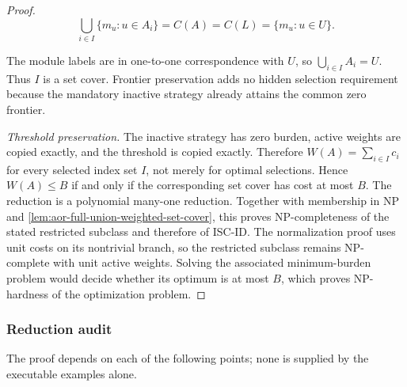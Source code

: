 \begin{proof}
\[
 \bigcup_{i\in I}\{m_u:u\in A_i\}
   =C(A)=C(L)=\{m_u:u\in U\}.
\]

The module labels are in one-to-one correspondence with $U$, so
$\bigcup_{i\in I}A_i=U$. Thus $I$ is a set cover. Frontier preservation adds
no hidden selection requirement because the mandatory inactive strategy
already attains the common zero frontier.

\emph{Threshold preservation.}
The inactive strategy has zero burden, active weights are copied exactly, and
the threshold is copied exactly. Therefore
$W(A)=\sum_{i\in I}c_i$ for every selected index set $I$, not merely for
optimal selections. Hence $W(A)\leq B$ if and only if the corresponding set
cover has cost at most $B$. The reduction is a polynomial many-one reduction.
Together with membership in NP and
\cref{lem:aor-full-union-weighted-set-cover}, this proves NP-completeness of
the stated restricted subclass and therefore of \textsc{ISC-ID}. The
normalization proof uses unit costs on its nontrivial branch, so the restricted
subclass remains NP-complete with unit active weights. Solving the associated
minimum-burden problem would decide whether its optimum is at most $B$, which
proves NP-hardness of the optimization problem.
\end{proof}

\subsubsection*{Reduction audit}

The proof depends on each of the following points; none is supplied by the
executable examples alone.

